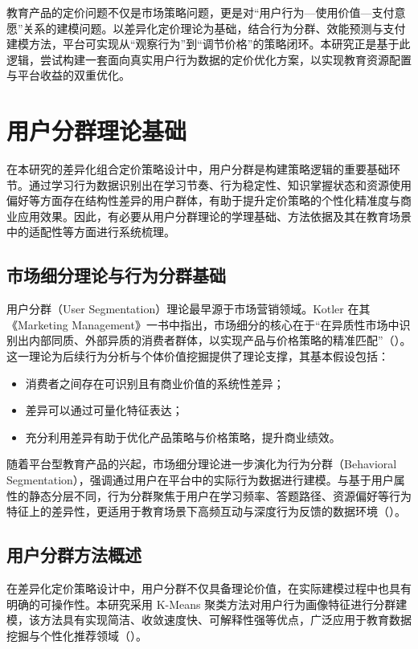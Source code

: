 教育产品的定价问题不仅是市场策略问题，更是对“用户行为—使用价值—支付意愿”关系的建模问题。以差异化定价理论为基础，结合行为分群、效能预测与支付建模方法，平台可实现从“观察行为”到“调节价格”的策略闭环。本研究正是基于此逻辑，尝试构建一套面向真实用户行为数据的定价优化方案，以实现教育资源配置与平台收益的双重优化。
\section{用户分群理论基础}
\label{sec:用户分群理论}

在本研究的差异化组合定价策略设计中，用户分群是构建策略逻辑的重要基础环节。通过学习行为数据识别出在学习节奏、行为稳定性、知识掌握状态和资源使用偏好等方面存在结构性差异的用户群体，有助于提升定价策略的个性化精准度与商业应用效果。因此，有必要从用户分群理论的学理基础、方法依据及其在教育场景中的适配性等方面进行系统梳理。

\subsection{市场细分理论与行为分群基础}

用户分群（User Segmentation）理论最早源于市场营销领域。Kotler 在其《Marketing Management》一书中指出，市场细分的核心在于“在异质性市场中识别出内部同质、外部异质的消费者群体，以实现产品与价格策略的精准匹配”（\cite{kotler2016marketing}）。这一理论为后续行为分析与个体价值挖掘提供了理论支撑，其基本假设包括：

\begin{itemize}
  \item 消费者之间存在可识别且有商业价值的系统性差异；
  \item 差异可以通过可量化特征表达；
  \item 充分利用差异有助于优化产品策略与价格策略，提升商业绩效。
\end{itemize}

随着平台型教育产品的兴起，市场细分理论进一步演化为行为分群（Behavioral Segmentation），强调通过用户在平台中的实际行为数据进行建模。与基于用户属性的静态分层不同，行为分群聚焦于用户在学习频率、答题路径、资源偏好等行为特征上的差异性，更适用于教育场景下高频互动与深度行为反馈的数据环境（\cite{xu2019usersegmentation}）。

\subsection{用户分群方法概述}

在差异化定价策略设计中，用户分群不仅具备理论价值，在实际建模过程中也具有明确的可操作性。本研究采用 K-Means 聚类方法对用户行为画像特征进行分群建模，该方法具有实现简洁、收敛速度快、可解释性强等优点，广泛应用于教育数据挖掘与个性化推荐领域（\cite{sun2021moocpricing}）。

